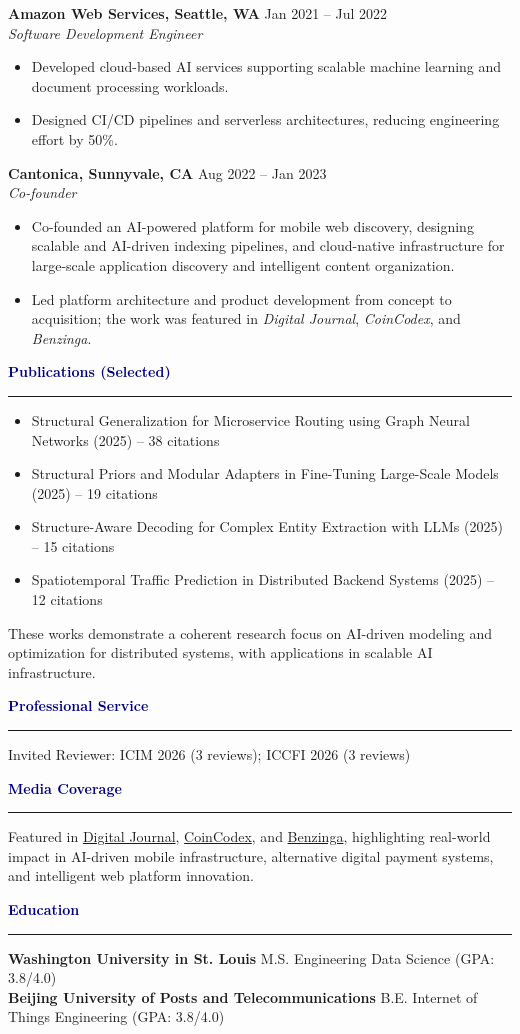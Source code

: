 \documentclass[letter,10pt]{article}
\newcommand{\cvsection}[1]{%
  \vspace{0.5em}
  {\large\textbf{\textcolor{navy}{#1}}}\par
  \vspace{0.15em}
  \hrule
  \vspace{0.35em}
}
\newcommand{\cventry}[3]{%
  \textbf{#1} \hfill #2\\
  \textit{#3}\par
}
\begin{document}
\cventry{Amazon Web Services, Seattle, WA}{Jan 2021 -- Jul 2022}{Software Development Engineer}
\begin{itemize}
  \item Developed cloud-based AI services supporting scalable machine learning and document processing workloads.
  \item Designed CI/CD pipelines and serverless architectures, reducing engineering effort by 50\%.
\end{itemize}


\cventry{Cantonica, Sunnyvale, CA}{Aug 2022 -- Jan 2023}{Co-founder}
\begin{itemize}
  \item Co-founded an AI-powered platform for mobile web discovery, designing scalable and AI-driven indexing pipelines, and cloud-native infrastructure for large-scale application discovery and intelligent content organization.
  \item Led platform architecture and product development from concept to acquisition; the work was featured in \textit{Digital Journal}, \textit{CoinCodex}, and \textit{Benzinga}.
\end{itemize}



\cvsection{Publications (Selected)}
\begin{itemize}
  \item Structural Generalization for Microservice Routing using Graph Neural Networks (2025) -- 38 citations
  \item Structural Priors and Modular Adapters in Fine-Tuning Large-Scale Models (2025) -- 19 citations
  \item Structure-Aware Decoding for Complex Entity Extraction with LLMs (2025) -- 15 citations
  \item Spatiotemporal Traffic Prediction in Distributed Backend Systems (2025) -- 12 citations
\end{itemize}

\small{These works demonstrate a coherent research focus on AI-driven modeling and optimization for distributed systems, with applications in scalable AI infrastructure.}

\cvsection{Professional Service}
Invited Reviewer: ICIM 2026 (3 reviews); ICCFI 2026 (3 reviews)

\cvsection{Media Coverage}
Featured in
\href{http://tinyurl.com/shaking-up-the-app-stores}{Digital Journal},
\href{http://tinyurl.com/empower-alternative-payments}{CoinCodex}, and
\href{http://tinyurl.com/unleashing-the-mobile-web}{Benzinga},
highlighting real-world impact in AI-driven mobile infrastructure, alternative digital payment systems, and intelligent web platform innovation.

\cvsection{Education}
\textbf{Washington University in St. Louis} \hfill M.S. Engineering Data Science (GPA: 3.8/4.0)\\
\textbf{Beijing University of Posts and Telecommunications} \hfill B.E. Internet of Things Engineering (GPA: 3.8/4.0)
\end{document}
